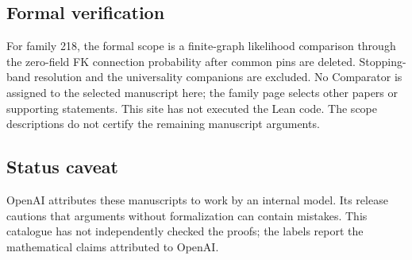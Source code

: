 \documentclass[11pt]{article}
\begin{document}
\subsection{Formal verification}
For family 218, the formal scope is a finite-graph likelihood comparison through the zero-field FK connection probability after common pins are deleted. Stopping-band resolution and the universality companions are excluded. No Comparator is assigned to the selected manuscript here; the family page selects other papers or supporting statements. This site has not executed the Lean code. The scope descriptions do not certify the remaining manuscript arguments.

\subsection{Status caveat}
OpenAI attributes these manuscripts to work by an internal model. Its release cautions that arguments without formalization can contain mistakes. This catalogue has not independently checked the proofs; the labels report the mathematical claims attributed to OpenAI.
\end{document}

